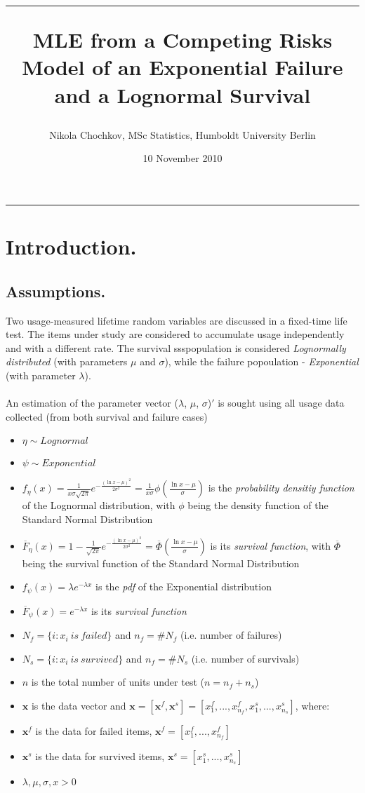 \documentclass{article}
\title{\hrule \vspace{0.3cm}MLE from a Competing Risks Model of an Exponential Failure and a Lognormal Survival}
\date{10 November 2010}
\author{Nikola Chochkov, MSc Statistics, Humboldt University Berlin}
\begin{document}
\maketitle
\hrule
\section{Introduction.}
\subsection{Assumptions.}
\indent \indent Two usage-measured lifetime random variables are discussed in a fixed-time life test. The items under study are considered to accumulate usage independently and with a different rate. The survival ssspopulation is considered \textit{Lognormally distributed} (with parameters $\mu$ and $\sigma$), while the failure popoulation - \textit{Exponential} (with parameter $\lambda$). 
\\ 
\\ \indent An estimation of the parameter vector ($\lambda$, $\mu$, $\sigma$)$'$ is sought using all usage data collected (from both survival and failure cases) 
\begin{itemize}
\item $\eta \sim Lognormal$ 
\item $\psi \sim Exponential$ 
\item $f_\eta(x) = \frac{1}{x \sigma \sqrt{2 \pi}} e^{-\frac{\left( \ln x - \mu \right)^2}{2\sigma^2}} = \frac{1}{x \sigma} \phi \left( \frac{\ln x - \mu}{\sigma} \right) $ is the \textit{probability densitiy function} of the Lognormal distribution, with $\phi$ being the density function of the Standard Normal Distribution
\item $\overline F_\eta(x) = 1 - \frac{1}{\sqrt{2 \pi}} e^{-\frac{\left( \ln x - \mu \right)^2}{2\sigma^2}} = \overline \Phi \left(\frac{\ln x - \mu}{\sigma}\right)$ is its \textit{survival function}, with $\overline\Phi$ being the survival function of the Standard Normal Distribution
\item $f_\psi(x) = \lambda e^{- \lambda x}$ is the \textit{pdf} of the Exponential distribution 
\item $\overline F_\psi(x) = e^{- \lambda x}$ is its \textit{survival function}
\item $N_f = \{i : x_i\ is\ failed \}$ and $n_f  = \# N_f$ (i.e. number of failures) 
\item $N_s = \{i : x_i\ is\ survived \}$ and $n_f  = \# N_s$ (i.e. number of survivals)
\item $n$ is the total number of units under test ($n = n_f + n_s$)
\item $\textbf{x}$ is the data vector and $\textbf{x} = \left[ \textbf{x}^f, \textbf{x}^s \right] = \left[ x_1^f, ... , x_{n_f}^f, x_1^s, ... , x_{n_s}^s \right] $, where:
\item $\textbf{x}^f$ is the data for failed items, $\textbf{x}^f = \left[ x_1^f, ... , x_{n_f}^f \right] $
\item $\textbf{x}^s$ is the data for survived items, $\textbf{x}^s = \left[ x_1^s, ... , x_{n_s}^s \right] $
\item $\lambda, \mu, \sigma, x > 0$
\end{itemize}
\end{document}
